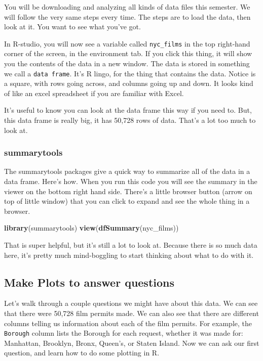 \documentclass[]{book}
\newenvironment{Shaded}{\begin{snugshade}}{\end{snugshade}}
\newcommand{\KeywordTok}[1]{\textcolor[rgb]{0.13,0.29,0.53}{\textbf{{#1}}}}
\newcommand{\NormalTok}[1]{{#1}}
\theoremstyle{definition}
\theoremstyle{definition}
\theoremstyle{definition}
\theoremstyle{remark}
\begin{document}
You will be downloading and analyzing all kinds of data files this
semester. We will follow the very same steps every time. The steps are
to load the data, then look at it. You want to see what you've got.

In R-studio, you will now see a variable called \texttt{nyc\_films} in
the top right-hand corner of the screen, in the environment tab. If you
click this thing, it will show you the contents of the data in a new
window. The data is stored in something we call a \texttt{data\ frame}.
It's R lingo, for the thing that contains the data. Notice is a square,
with rows going across, and columns going up and down. It looks kind of
like an excel spreadsheet if you are familiar with Excel.

It's useful to know you can look at the data frame this way if you need
to. But, this data frame is really big, it has 50,728 rows of data.
That's a lot too much to look at.

\subsubsection{summarytools}\label{summarytools}

The summarytools packages give a quick way to summarize all of the data
in a data frame. Here's how. When you run this code you will see the
summary in the viewer on the bottom right hand side. There's a little
browser button (arrow on top of little window) that you can click to
expand and see the whole thing in a browser.

\begin{Shaded}
\begin{Highlighting}[]
\KeywordTok{library}\NormalTok{(summarytools)}
\KeywordTok{view}\NormalTok{(}\KeywordTok{dfSummary}\NormalTok{(nyc_films))}
\end{Highlighting}
\end{Shaded}

That is super helpful, but it's still a lot to look at. Because there is
so much data here, it's pretty much mind-boggling to start thinking
about what to do with it.

\subsection{Make Plots to answer
questions}\label{make-plots-to-answer-questions}

Let's walk through a couple questions we might have about this data. We
can see that there were 50,728 film permits made. We can also see that
there are different columns telling us information about each of the
film permits. For example, the \texttt{Borough} column lists the Borough
for each request, whether it was made for: Manhattan, Brooklyn, Bronx,
Queen's, or Staten Island. Now we can ask our first question, and learn
how to do some plotting in R.
\end{document}
